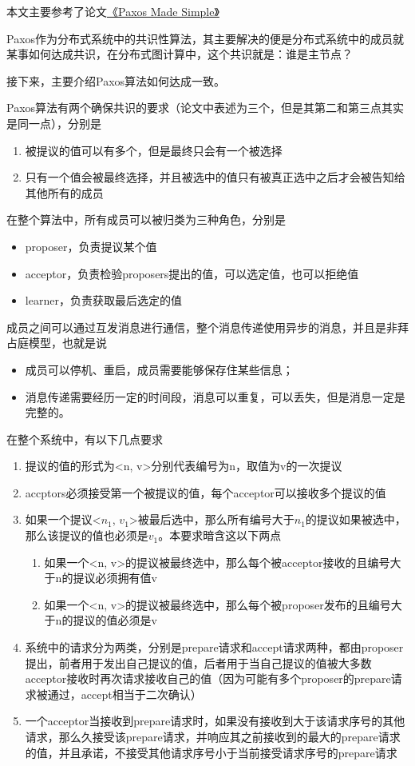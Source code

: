 \documentclass{article}
\begin{document}
本文主要参考了论文\href{https://lamport.azurewebsites.net/pubs/paxos-simple.pdf}{《Paxos Made Simple》}

Paxos作为分布式系统中的共识性算法，其主要解决的便是分布式系统中的成员就某事如何达成共识，在分布式图计算中，这个共识就是：谁是主节点？

接下来，主要介绍Paxos算法如何达成一致。

Paxos算法有两个确保共识的要求（论文中表述为三个，但是其第二和第三点其实是同一点），分别是
	\begin{enumerate}
		\item 被提议的值可以有多个，但是最终只会有一个被选择
		\item 只有一个值会被最终选择，并且被选中的值只有被真正选中之后才会被告知给其他所有的成员
	\end{enumerate}

在整个算法中，所有成员可以被归类为三种角色，分别是
	\begin{itemize}
		\item proposer，负责提议某个值
		\item acceptor，负责检验proposers提出的值，可以选定值，也可以拒绝值
		\item learner，负责获取最后选定的值
	\end{itemize}

成员之间可以通过互发消息进行通信，整个消息传递使用异步的消息，并且是非拜占庭模型，也就是说
	\begin{itemize}
		\item 成员可以停机、重启，成员需要能够保存住某些信息；
		\item 消息传递需要经历一定的时间段，消息可以重复，可以丢失，但是消息一定是完整的。
	\end{itemize}

	在整个系统中，有以下几点要求

	\begin{enumerate}
		\item 提议的值的形式为<n, v>分别代表编号为n，取值为v的一次提议
		\item accptors必须接受第一个被提议的值，每个acceptor可以接收多个提议的值
		\item 如果一个提议<$n_{1}$, $v_{1}$>被最后选中，那么所有编号大于$n_{1}$的提议如果被选中，那么该提议的值也必须是$v_{1}$。本要求暗含这以下两点
			\begin{enumerate}
				\item 如果一个<n, v>的提议被最终选中，那么每个被acceptor接收的且编号大于n的提议必须拥有值v
				\item 如果一个<n, v>的提议被最终选中，那么每个被proposer发布的且编号大于n的提议的值必须是v
			\end{enumerate}
		\item 系统中的请求分为两类，分别是prepare请求和accept请求两种，都由proposer提出，前者用于发出自己提议的值，后者用于当自己提议的值被大多数acceptor接收时再次请求接收自己的值（因为可能有多个proposer的prepare请求被通过，accept相当于二次确认）
		\item 一个acceptor当接收到prepare请求时，如果没有接收到大于该请求序号的其他请求，那么久接受该prepare请求，并响应其之前接收到的最大的prepare请求的值，并且承诺，不接受其他请求序号小于当前接受请求序号的prepare请求
	\end{enumerate}
\end{document}
